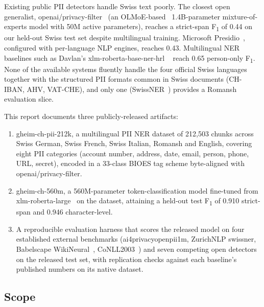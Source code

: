 \documentclass[sigconf,nonacm]{acmart}
\newcommand*{\Bsl}{\discretionary{/}{}{/}}%
\newcommand*{\Bhy}{\discretionary{-}{}{-}}%
\begin{document}
Existing public PII detectors handle Swiss text poorly. The closest
open generalist, \textsf{openai/privacy-filter}~\cite{openai2025privacyfilter}
(an OLMoE-based~\cite{muennighoff2024olmoe} 1.4B-parameter
mixture-of-experts model with 50M active parameters), reaches a
strict-span F\textsubscript{1} of 0.44 on our held-out Swiss test
set despite multilingual training. Microsoft Presidio~\cite{microsoft2023presidio},
configured with per-language NLP engines, reaches 0.43. Multilingual
NER baselines such as Davlan's \textsf{xlm-roberta-base-ner-hrl}
~\cite{davlan2022xlmrnerhrl} reach 0.65 person-only F\textsubscript{1}.
None of the available systems fluently handle the four official
Swiss languages together with the structured PII formats common in
Swiss documents (CH-IBAN, AHV, VAT-CHE), and only one
(SwissNER~\cite{vamvas2023swissner}) provides a Romansh evaluation
slice.

This report documents three publicly-released artifacts:

\begin{enumerate}
  \item \textsf{gheim-ch-pii-212k}, a multilingual PII NER dataset of
        212,503 chunks across Swiss German, Swiss French, Swiss Italian,
        Romansh and English, covering eight PII categories
        (account number, address, date, email, person, phone, URL,
        secret), encoded in a 33-class BIOES tag scheme byte-aligned
        with \textsf{openai/privacy-filter}.
  \item \textsf{gheim-ch-560m}, a 560M-parameter token-classification
        model fine-tuned from \textsf{xlm-roberta-large}~\cite{conneau2020unsupervised}
        on the dataset, attaining a held-out test F\textsubscript{1}
        of 0.910 strict-span and 0.946 character-level.
  \item A reproducible evaluation harness that scores the released
        model on four established external benchmarks
        (\textsf{ai4privacy\Bsl openpii\Bhy 1m}, ZurichNLP \textsf{swissner},
        Babelscape \textsf{WikiNeural}~\cite{tedeschi2021wikineural},
        CoNLL\Bhy 2003~\cite{tjong2003introduction}) and seven competing
        open detectors on the released test set, with replication
        checks against each baseline's published numbers on its native
        dataset.
\end{enumerate}

\subsection{Scope}
\label{sec:scope}
\end{document}
